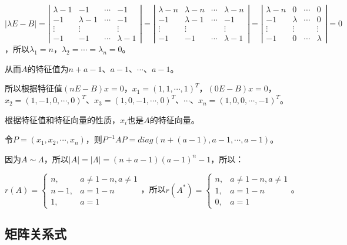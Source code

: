 $\vert\lambda E-B\vert=\left\vert\begin{array}{cccc}
    \lambda-1 & -1 & \cdots & -1 \\
    -1 & \lambda-1 & \cdots & -1 \\
    \vdots & \vdots & & \vdots \\
    -1 & -1 & \cdots & \lambda-1
\end{array}\right\vert=\left\vert\begin{array}{cccc}
    \lambda-n & \lambda-n & \cdots & \lambda-n \\
    -1 & \lambda-1 & \cdots & -1 \\
    \vdots & \vdots & & \vdots \\
    -1 & -1 & \cdots & \lambda-1
\end{array}\right\vert=\left\vert\begin{array}{cccc}
    \lambda-n & 0 & \cdots & 0 \\
    -1 & \lambda & \cdots & 0 \\
    \vdots & \vdots & & \vdots \\
    -1 & 0 & \cdots & \lambda
\end{array}\right\vert=0$，所以$\lambda_1=n$，$\lambda_2=\cdots=\lambda_n=0$。

从而$A$的特征值为$n+a-1$、$a-1$、$\cdots$、$a-1$。

所以根据特征值$(nE-B)x=0$，$x_1=(1,1,\cdots,1)^T$，$(0E-B)x=0$，$x_2=(1,-1,0,\cdots,0)^T$、$x_3=(1,0,-1,\cdots,0)^T$、$\cdots$、$x_n=(1,0,0,\cdots,-1)^T$。

根据特征值和特征向量的性质，$x_i$也是$A$的特征向量。

令$P=(x_1,x_2,\cdots,x_n)$，则$P^{-1}AP=diag(n+(a-1),a-1,\cdots,a-1)$。

因为$A\sim\Lambda$，所以$\vert A\vert=\vert\Lambda\vert=(n+a-1)(a-1)^n-1$，所以：

$r(A)=\left\{\begin{array}{ll}
    n, & a\neq1-n,a\neq1 \\
    n-1, & a=1-n \\
    1, & a=1
\end{array}\right.$，所以$r(A^*)=\left\{\begin{array}{ll}
    n, & a\neq1-n,a\neq1 \\
    1, & a=1-n \\
    0, & a=1
\end{array}\right.$。

\subsection{矩阵关系式}

